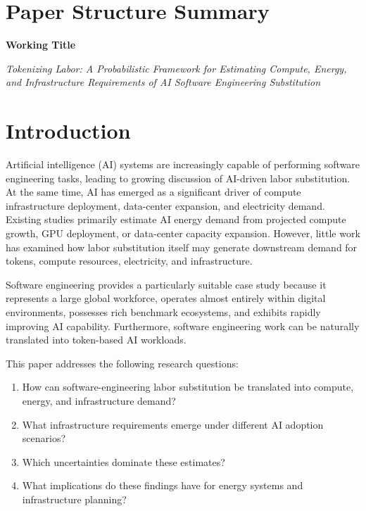 \section*{Paper Structure Summary}

\textbf{Working Title}

\begin{center}
\textit{Tokenizing Labor: A Probabilistic Framework for Estimating Compute, Energy, and Infrastructure Requirements of AI Software Engineering Substitution}
\end{center}

\vspace{0.5em}

\section{Introduction}

Artificial intelligence (AI) systems are increasingly capable of performing software engineering tasks, leading to growing discussion of AI-driven labor substitution. At the same time, AI has emerged as a significant driver of compute infrastructure deployment, data-center expansion, and electricity demand. Existing studies primarily estimate AI energy demand from projected compute growth, GPU deployment, or data-center capacity expansion. However, little work has examined how labor substitution itself may generate downstream demand for tokens, compute resources, electricity, and infrastructure.

Software engineering provides a particularly suitable case study because it represents a large global workforce, operates almost entirely within digital environments, possesses rich benchmark ecosystems, and exhibits rapidly improving AI capability. Furthermore, software engineering work can be naturally translated into token-based AI workloads.

This paper addresses the following research questions:

\begin{enumerate}
\item How can software-engineering labor substitution be translated into compute, energy, and infrastructure demand?
\item What infrastructure requirements emerge under different AI adoption scenarios?
\item Which uncertainties dominate these estimates?
\item What implications do these findings have for energy systems and infrastructure planning?
\end{enumerate}

